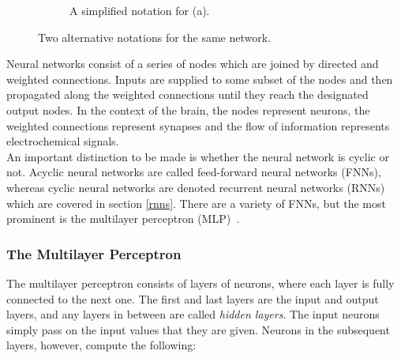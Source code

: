 \documentclass[a4paper, 12pt]{report}
\newcommand{\tit}[1]{\textit{#1}}
\begin{document}
\begin{figure}[h]
\begin{subfigure}{0.5\linewidth}
	\caption{A simplified notation for (a).}
\end{subfigure}
\caption{Two alternative notations for the same network.}
\end{figure}

Neural networks consist of a series of nodes which are joined by directed and weighted connections. Inputs are supplied to some subset of the nodes and then propagated along the weighted connections until they reach the designated output nodes. In the context of the brain, the nodes represent neurons, the weighted connections represent synapses and the flow of information represents electrochemical signals. \\

An important distinction to be made is whether the neural network is cyclic or not. Acyclic neural networks are called feed-forward neural networks (FNNs), whereas cyclic neural networks are denoted recurrent neural networks (RNNs) which are covered in section \ref{rnns}. There are a variety of FNNs, but the most prominent is the multilayer perceptron (MLP)~\cite{backprop:rumelhart1985}.

\subsubsection{The Multilayer Perceptron}

The multilayer perceptron consists of layers of neurons, where each layer is fully connected to the next one. The first and last layers are the input and output layers, and any layers in between are called \tit{hidden layers}. The input neurons simply pass on the input values that they are given. Neurons in the subsequent layers, however, compute the following:
\end{document}
